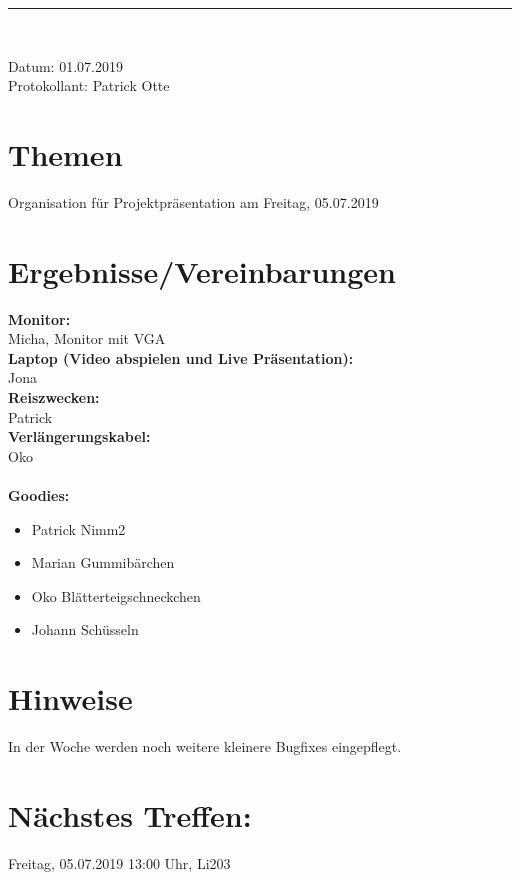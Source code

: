 \begin{center}  
\vspace{0.5pt}\nointerlineskip\rule{\textwidth}{0.2pt}\\ 
\vspace{0.5pt}\nointerlineskip
\end{center} 
\large Datum: 01.07.2019\vspace{3pt}\\\large Protokollant: Patrick Otte
\section*{Themen}
Organisation für Projektpräsentation am Freitag, 05.07.2019
\section*{Ergebnisse/Vereinbarungen}
\textbf{Monitor:}\\
Micha, Monitor mit VGA\\
\textbf{Laptop (Video abspielen und Live Präsentation):}\\
Jona\\
\textbf{Reiszwecken:}\\
Patrick\\
\textbf{Verlängerungskabel:}\\
Oko\\\\
\textbf{Goodies:}
\begin{itemize}
\item Patrick Nimm2
\item Marian Gummibärchen
\item Oko Blätterteigschneckchen
\item Johann Schüsseln
\end{itemize}

\section*{Hinweise}
In der Woche werden noch weitere kleinere Bugfixes eingepflegt.
\section*{Nächstes Treffen:}
Freitag, 05.07.2019 13:00 Uhr, Li203
